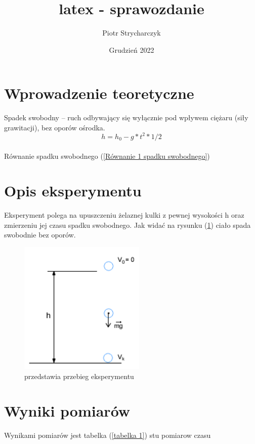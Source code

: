 \documentclass{article}
\title{latex - sprawozdanie}
\author{Piotr Strycharczyk}
\date{Grudzień 2022}
\begin{document}
\maketitle

\section{Wprowadzenie teoretyczne}
Spadek swobodny – ruch odbywający się wyłącznie pod wpływem ciężaru (siły grawitacji), bez oporów ośrodka.\\

\begin{equation}
h=h_0-g*t^2*1/2
\label{Równanie 1 spadku swobodnego}
\end{equation}\\
Równanie spadku swobodnego (\ref{Równanie 1 spadku swobodnego})


\section{Opis eksperymentu}

Eksperyment polega na upuszczeniu żelaznej kulki z pewnej wysokości h oraz zmierzeniu jej czasu spadku swobodnego. Jak widać na rysunku (\ref{zdjecie 1}) ciało spada swobodnie bez oporów.

\begin{figure}[htb]
    \includegraphics[width=6cm]{images.png}
    \centering
    \caption{przedstawia przebieg eksperymentu}
    \label{zdjecie 1}
\end{figure}


\section{Wyniki pomiarów}
Wynikami pomiarów jest tabelka (\ref{tabelka 1}) stu pomiarow czasu
\end{document}
